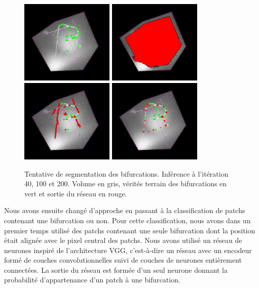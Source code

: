 \begin{figure}[ht]
    \centering
    \includegraphics[height=4cm]{Images/exp_seg_gt.png}
    \includegraphics[height=4cm]{Images/exp_seg_40.png}
    \includegraphics[height=4cm]{Images/exp_seg_100.png}
    \includegraphics[height=4cm]{Images/exp_seg_200.png}
    \caption{Tentative de segmentation des bifurcations. Inférence à l'itération 40, 100 et 200. Volume en gris, vérités terrain des bifurcations en vert et sortie du réseau en rouge. }
    \label{fig:seg_deep}
\end{figure}

Nous avons ensuite changé d'approche en passant à la classification de patchs contenant une bifurcation ou non. Pour cette classification, nous avons dans un premier temps utilisé des patchs contenant une seule bifurcation dont la position était alignée avec le pixel central des patchs. Nous avons utilisé un réseau de neurones inspiré de l'architecture VGG, c'est-à-dire un réseau avec un encodeur formé de couches convolutionnelles suivi de couches de neurones entièrement connectées. La sortie du réseau est formée d'un seul neurone donnant la probabilité d'appartenance d'un patch à une bifurcation. 

